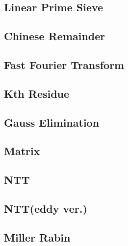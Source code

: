 \documentclass[a4paper,10pt,twocolumn,oneside]{article}
\begin{document}
\subsection{Linear Prime Sieve}


% 

\subsection{Chinese Remainder}


\subsection{Fast Fourier Transform}


\subsection{Kth Residue}


\subsection{Gauss Elimination}


\subsection{Matrix}


\subsection{NTT}


\subsection{NTT(eddy ver.)}


\subsection{Miller Rabin}

\end{document}
